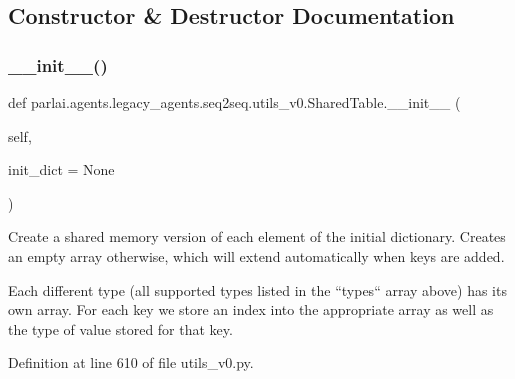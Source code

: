 \subsection{Constructor \& Destructor Documentation}
\mbox{\label{classparlai_1_1agents_1_1legacy__agents_1_1seq2seq_1_1utils__v0_1_1SharedTable_a0bb7ef513d5028c6f011cc09c6934dea}} 
\subsubsection{\texorpdfstring{\+\_\+\+\_\+init\+\_\+\+\_\+()}{\_\_init\_\_()}}
{\footnotesize\ttfamily def parlai.\+agents.\+legacy\+\_\+agents.\+seq2seq.\+utils\+\_\+v0.\+Shared\+Table.\+\_\+\+\_\+init\+\_\+\+\_\+ (\begin{DoxyParamCaption}\item[{}]{self,  }\item[{}]{init\+\_\+dict = {\ttfamily None} }\end{DoxyParamCaption})}

\begin{DoxyVerb}Create a shared memory version of each element of the initial dictionary.
Creates an empty array otherwise, which will extend automatically when keys are
added.

Each different type (all supported types listed in the ``types`` array above)
has its own array. For each key we store an index into the appropriate array as
well as the type of value stored for that key.
\end{DoxyVerb}
 

Definition at line 610 of file utils\+\_\+v0.\+py.


